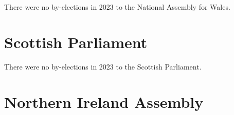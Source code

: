 \documentclass[a4paper,openany]{book}
\begin{document}
There were no by-elections in 2023 to the National Assembly for Wales.


\section{Scottish Parliament}

There were no by-elections in 2023 to the Scottish Parliament.

%
%
%

%
%

\section{Northern Ireland Assembly}
\end{document}
